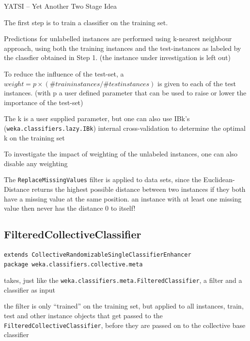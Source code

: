 \documentclass[a4paper]{book}
\begin{document}
\begin{tight_itemize}
	\item YATSI -- Yet Another Two Stage Idea \cite{yatsi}
	\item The first step is to train a classifier on the training set.
	\item Predictions for unlabelled instances are performed using k-nearest 
	neighbour approach, using both the training instances and the test-instances 
	as labeled by the classfier obtained in Step 1. (the instance under 
	investigation is left out)
	\item To reduce the influence of the test-set, a 
	$weight = p \times (\#train instances / \#test instances)$ is given to each 
	of the test instances. (with p a user defined parameter that can be used to 
	raise or lower the importance of the test-set)
	\item The k is a user supplied parameter, but one can also use IBk's 
	(\texttt{weka.classifiers.lazy.IBk}) internal cross-validation to determine 
	the optimal k on the training set
	\item To investigate the impact of weighting of the unlabeled instances, 
	one can also disable any weighting
	\item The \texttt{ReplaceMissingValues} filter is applied to data sets, 
	since the Euclidean-Distance returns the highest possible distance between 
	two instances if they both have a missing value at the same position. an 
	instance with at least one missing value then never has the distance 0 to itself!
\end{tight_itemize}

\subsection{FilteredCollectiveClassifier}
\begin{verbatim}
extends CollectiveRandomizableSingleClassifierEnhancer
package weka.classifiers.collective.meta
\end{verbatim}

\begin{tight_itemize}
	\item takes, just like the \texttt{weka.classifiers.meta.FilteredClassifier}, 
	a filter and a classifier as input
	\item the filter is only ``trained'' on the training set, but applied to 
	all instances, train, test and other instance objects that get passed to the 
	\texttt{FilteredCollectiveClassifier}, before they are passed on to the 
	collective base classifier
\end{tight_itemize}
\end{document}

